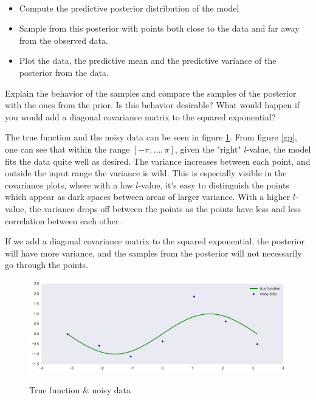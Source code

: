 \documentclass[12pt]{article}
\newenvironment{question}[2][Question]{\begin{trivlist}
\kern10pt
\item[\hskip \labelsep {\bfseries #1}\hskip \labelsep {\bfseries #2.}]}{\end{trivlist}}
\newcommand*{\answer}{%
  \par
  \kern1pt
  \begingroup
    \centering
    \raisebox{.2\baselineskip}{%
      \textcolor{gray}{
	    \rule{.6667\linewidth}{.1pt}%
      }
    }%
    \par
  \kern8pt
  \endgroup
}
\begin{document}
\begin{question}{14}
$ $
\begin{itemize}
\item Compute the predictive posterior distribution of the model
\item Sample from this posterior with points both close to the data and far away from the observed data.
\item Plot the data, the predictive mean and the predictive variance of the posterior from the data.
\end{itemize}

Explain the behavior of the samples and compare the samples of the posterior with the ones from the prior. Is this behavior desirable? What would happen if you would add a diagonal covariance matrix to the squared exponential?

\answer

The true function and the noisy data can be seen in figure \ref{sin_noisy}. From figure \ref{gp}, one can see that within the range $[-\pi, ..., \pi]$, given the "right" $l$-value, the model fits the data quite well as desired. The variance increases between each point, and outside the input range the variance is wild. This is especially visible in the covariance plots, where with a low $l$-value, it's easy to distinguish the points which appear as dark spaces between areas of larger variance. With a higher $l$-value, the variance drops off between the points as the points have less and less correlation between each other. 

If we add a diagonal covariance matrix to the squared exponential, the posterior will have more variance, and the samples from the posterior will not necessarily go through the points.

\begin{figure}
\caption{True function \& noisy data}
\includegraphics[scale=0.4]{sin_noisy}
\centering
\label{sin_noisy}
\end{figure}


\end{question}
\end{document}
